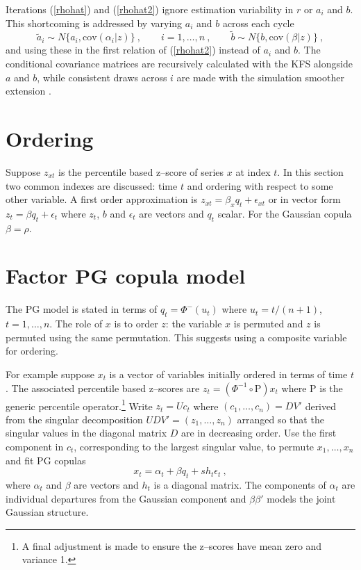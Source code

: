 \documentclass[authoryear]{elsarticle}
\newcommand{\cov}{\mathrm{cov}}
\newcommand{\eps}{\epsilon}
\newcommand{\eref}[1]{(\ref{#1})}
\newcommand{\cq}{\ , \qquad}
\renewcommand{\P}{\mathrm{P}}
\begin{document}
Iterations \eref{rhohat} and \eref{rhohat2}  ignore  estimation variability in $r$ or $a_i$ and $b$.  This shortcoming is addressed by varying  $a_i$ and $b$  across  each cycle 
$$
\tilde a_i \sim N\{a_i,\cov(\alpha_i|  z)\}\cq i=1,\ldots,n\cq  \tilde b\sim N\{b,\cov(\beta|  z)\}\ ,
$$
and using these  in the first relation of \eref{rhohat2}  instead of $a_i$ and $b$.
The conditional covariance matrices are recursively calculated  with the KFS alongside $a$ and $b$, while consistent  draws  across $i$  are made with the 
simulation smoother extension  \citep{DeJong&Shephard:95}. 

\section{Ordering}

Suppose $z_{xt}$ is the percentile based z--score of series $x$ at index $t$.   In this section two common indexes are discussed:   time $t$ and ordering with respect to some other variable.    A first order approximation is $z_{xt} = \beta_xq_t + \eps_{xt}$ or in vector form $z_t=\beta q_t + \eps_t$ where $z_t$, $b$ and $\eps_t$ are vectors and $q_t$ scalar.   For the Gaussian copula $\beta=\rho$.

\section{Factor PG copula model}

The PG  model is stated in terms of  $q_t=\Phi^-(u_t)$ where $u_t=t/(n+1)$, $t=1,\ldots,n$.   The  role of $x$  is to order $z$:  the variable $x$ is permuted  and $z$ is permuted using the same permutation.   This suggests using a composite variable for ordering.

For example suppose $x_t$ is a vector of variables initially ordered in terms of time $t$.   The associated percentile based z--scores  are   $z_t= (\Phi^{-1}\circ \P) x_t$ where $\P$ is the generic percentile operator.\footnote{A final adjustment is made to ensure the z--scores have mean zero and variance 1.}   Write $z_t=Uc_t$ where $(c_1,\ldots,c_n)=DV'$ derived from the singular decomposition $UDV'=(z_1,\ldots,z_n)$ arranged so that the singular values in the diagonal matrix $D$ are in decreasing order.   Use the first component in $c_t$, corresponding to the largest singular value,  to permute $x_1,\ldots,x_n$ and fit PG copulas
$$
x_t = \alpha_t + \beta q_t + sh_t\eps_t\ ,
$$
where $\alpha_t$ and $\beta$ are vectors and $h_t$ is a diagonal matrix.  The components of $\alpha_t$ are individual departures from the Gaussian component and $\beta\beta'$ models the joint Gaussian structure.
\end{document}
